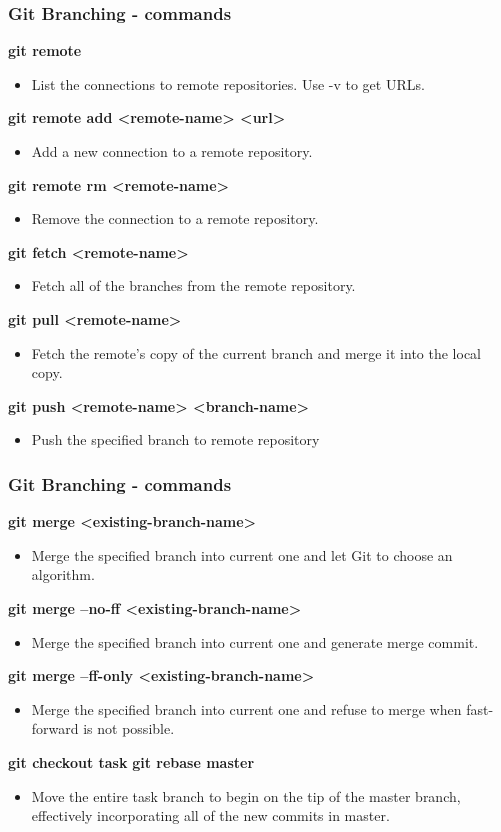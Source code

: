 \begin{frame}
\frametitle{Git Branching - commands}
\textbf{git remote}
	\begin{itemize}
	\item List the connections to remote repositories. Use -v to get URLs. 
	\end{itemize}
\textbf{git remote add <remote-name> <url>}
	\begin{itemize}
	\item Add a new connection to a remote repository.
	\end{itemize}
\textbf{git remote rm <remote-name>}
	\begin{itemize}
 	\item Remove the connection to a remote repository.
	\end{itemize}
\textbf{git fetch <remote-name>}
	\begin{itemize}
	\item Fetch all of the branches from the remote repository.
	\end{itemize}
\textbf{git pull <remote-name>}
	\begin{itemize}
	\item Fetch the remote’s copy of the current branch and merge it into the local copy.
	\end{itemize}
\textbf{git push <remote-name> <branch-name>}
	\begin{itemize}
	\item Push the specified branch to remote repository
	\end{itemize}
\end{frame}

\begin{frame}
\frametitle{Git Branching - commands}
\textbf{git merge <existing-branch-name>}
	\begin{itemize}
	\item Merge the specified branch into current one and let Git to choose an algorithm.
	\end{itemize}
\textbf{git merge --no-ff <existing-branch-name>}
	\begin{itemize}
	\item Merge the specified branch into current one and generate merge commit.
	\end{itemize}
\textbf{git merge --ff-only <existing-branch-name>}
	\begin{itemize}
	\item Merge the specified branch into current one and refuse to merge when fast-forward is not possible.
	\end{itemize}
\textbf{git checkout task}
\textbf{git rebase master}
	\begin{itemize}
	\item Move the entire task branch to begin on the tip of the master branch, effectively incorporating all of the new commits in master.
	\end{itemize}
\end{frame}

